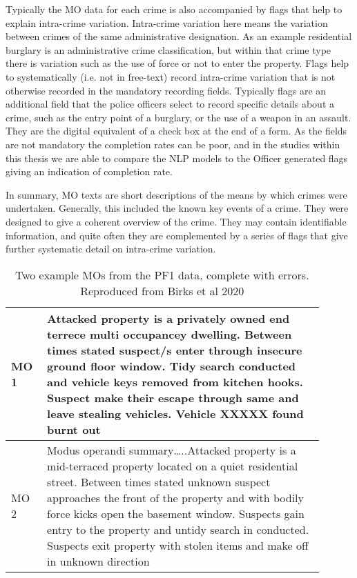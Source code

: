 Typically the MO data for each crime is also accompanied by flags that help to explain intra-crime variation. Intra-crime variation here means the variation between crimes of the same administrative designation. As an example residential burglary is an administrative crime classification, but within that crime type there is variation such as the use of force or not to enter the property. Flags help to systematically (i.e. not in free-text) record intra-crime variation that is not otherwise recorded in the mandatory recording fields. Typically flags are an additional field that the police officers select to record specific details about a crime, such as the entry point of a burglary, or the use of a weapon in an assault. They are the digital equivalent of a check box at the end of a form. As the fields are not mandatory the completion rates can be poor, and in the studies within this thesis we are able to compare the NLP models to the Officer generated flags giving an indication of completion rate.

In summary, MO texts are short  descriptions of the means by which crimes were undertaken. Generally, this included the known key events of a crime. They were designed to give a coherent overview of the crime. They may contain identifiable information, and quite often they are complemented by a series of flags that give further systematic detail on intra-crime variation.

\begin{table}[]
\centering
\begin{tabular}{p{0.1\linewidth}p{0.8\linewidth}}

\toprule
MO 1 & Attacked property is a privately owned end terrece multi occupancey dwelling. Between times stated suspect/s enter through insecure ground floor window. Tidy search conducted and vehicle keys removed from kitchen hooks. Suspect make their escape through same and leave stealing vehicles. Vehicle XXXXX found burnt out                                                               \\ \midrule
MO 2 & Modus operandi summary…..Attacked property is a mid-terraced property located on a quiet residential street. Between times stated unknown suspect approaches the front of the property and with bodily force kicks open the basement window. Suspects gain entry to the property and untidy search in conducted. Suspects exit property with stolen items and make off in unknown direction \\ \bottomrule
\end{tabular}
\caption[MO examples from PF1]{\label{tab:example_mo} Two example MOs from the PF1 data, complete with errors. Reproduced from Birks et al 2020}
\end{table}


